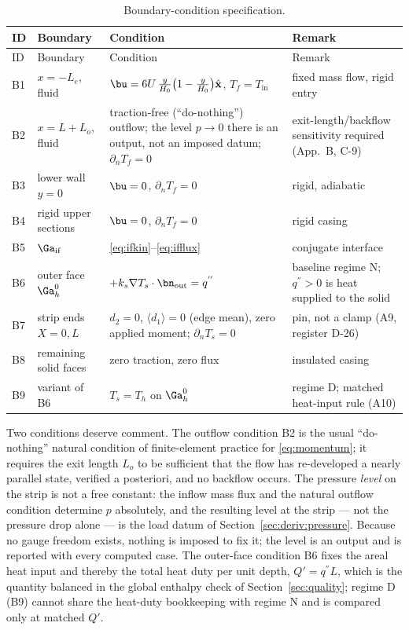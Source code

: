\begin{longtable}{p{1.0cm}p{2.6cm}p{7.2cm}p{3.9cm}}
\caption{Boundary-condition specification.}\label{tab:bcs}\\
\toprule
ID & Boundary & Condition & Remark \\
\midrule
\endfirsthead
\toprule
ID & Boundary & Condition & Remark \\
\midrule
\endhead
B1 & $x=-L_e$, fluid & $\bu=6U\,\tfrac{y}{H_0}\big(1-\tfrac{y}{H_0}\big)\hat{\mathbf x}$, $T_f=T_{\mathrm{in}}$ & fixed mass flow, rigid entry \\
B2 & $x=L+L_o$, fluid & traction-free (``do-nothing'') outflow; the level $p\to0$ there is an output, not an imposed datum; $\partial_nT_f=0$ & exit-length/backflow sensitivity required (App.~B, C-9) \\
B3 & lower wall $y=0$ & $\bu=0$, $\partial_nT_f=0$ & rigid, adiabatic \\
B4 & rigid upper sections & $\bu=0$, $\partial_nT_f=0$ & rigid casing \\
B5 & $\Ga_{\mathrm{if}}$ & \eqref{eq:ifkin}--\eqref{eq:ifflux} & conjugate interface \\
B6 & outer face $\Ga_h^0$ & $+k_s\nabla T_s\cdot\bn_{\mathrm{out}}=q^{''}$ & baseline regime N; $q^{''}>0$ is heat supplied to the solid \\
B7 & strip ends $X=0,L$ & $d_2=0$, $\langle d_1\rangle=0$ (edge mean), zero applied moment; $\partial_nT_s=0$ & pin, not a clamp (A9, register D-26) \\
B8 & remaining solid faces & zero traction, zero flux & insulated casing \\
B9 & variant of B6 & $T_s=T_h$ on $\Ga_h^0$ & regime D; matched heat-input rule (A10) \\
\bottomrule
\end{longtable}

Two conditions deserve comment. The outflow condition B2 is the usual ``do-nothing'' natural
condition of finite-element practice for \eqref{eq:momentum}; it requires the exit length $L_o$ to
be sufficient that the flow has re-developed a nearly parallel state, verified a posteriori, and no
backflow occurs. The pressure \emph{level} on the strip is not a free constant: the inflow mass
flux and the natural outflow condition determine $p$ absolutely, and the resulting level at the
strip --- not the pressure drop alone --- is the load datum of
Section~\ref{sec:deriv:pressure}. Because no gauge freedom exists, nothing is imposed to fix it; the
level is an output and is reported with every computed case. The outer-face condition B6 fixes the areal heat input and thereby the total heat
duty per unit depth, $Q'=q^{''}L$, which is the quantity balanced in the global enthalpy check of
Section~\ref{sec:quality}; regime D (B9) cannot share the heat-duty bookkeeping with regime N and
is compared only at matched $Q'$.

